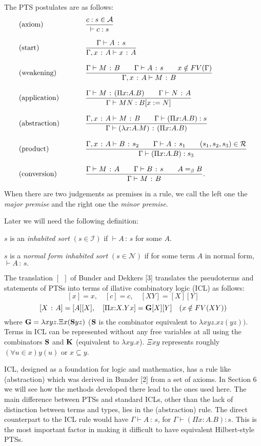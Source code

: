 \documentclass{LMCS}
\def\:{\mathbin{\,:\,}}
\begin{document}
  The PTS postulates are as follows:
\smallskip
{\small\[\begin{tabular}{lllllll}
(axiom)&&& $\displaystyle{{c:s\in {\mathcal A}\over\vdash c:s}}$\cr\cr
(start)&&&$\displaystyle{\Gamma\vdash A\:s\over\Gamma,x\:A\vdash x\:A}$\cr\cr
(weakening)&&& $\displaystyle
{{\Gamma\vdash M\:B\qquad\Gamma\vdash A\:s\qquad x\notin FV
(\Gamma)\over\Gamma, x\:A\vdash M\:B }}$\cr\cr
(application)&&& $\displaystyle{{\Gamma\vdash M\:(\Pi x{:}A.B)\qquad
\Gamma\vdash N\:A\over\Gamma\vdash MN:B[x:=N]}}$\cr\cr
(abstraction)&&&$\displaystyle{{\Gamma,x\:A\vdash
M\:B\qquad\Gamma\vdash(\Pi x{:}A.B):s\over\Gamma\vdash(\lambda
x{:}A.M)\:(\Pi x{:}A.B)}}$\cr\cr
(product)&&&$\displaystyle{{\Gamma,x\:A\vdash B\:s_2
\qquad\Gamma\vdash A\:s_1\qquad (s_1,s_2,s_3)\in {\mathcal R}\over
\Gamma\vdash(\Pi x{:}A.B):s_3}}$\cr\cr
(conversion)&&&$\displaystyle{{\Gamma\vdash M\:A\qquad\Gamma\vdash
B\:s\qquad A=_{\beta} B\over\Gamma\vdash M\:B}}.$\cr
\end{tabular}
\]}\smallskip

  \noindent When there are two judgements as premises in a rule, we call the
  left one the \emph{major premise} and the right one the \emph{minor
    premise}.

  Later we will need the following definition:

\begin{defi}\hfill

  $s$ is an \emph{inhabited sort} $(s\in\mathcal I)$ if $\vdash A\:s$
  for some $A$.

  $s$ is a \emph{normal form inhabited sort} $(s\in\mathcal N)$ if
  for some term $A$ in normal form, $\vdash A\:s.$
\end{defi}

  The translation $[\ \ ]$ of Bunder and Dekkers [3]
  translates the pseudoterms and statements of PTSs into terms
  of illative combinatory logic (ICL) as follows:
\[[x] = x,\quad[c]=c,\quad [XY]=[X][Y]\]
\[[X\:A] = [A][X],\quad [\Pi x{:}X.Yx] ={\bf G} [X][Y]\quad (x\notin FV(XY))\]
  where ${\bf G}=\lambda xyz.\Xi x({\bf S}yz)$ (${\bf S}$ is the
  combinator equivalent to $\lambda xyz.xz(yz))$. Terms in ICL can be
  represented without any free variables at all using the combinators
  ${\bf S}$ and ${\bf K}$ (equivalent to $\lambda xy.x$). $\Xi xy$
  represents roughly $(\forall u\in x) y(u)$ or $x\subseteq y$.

  ICL, designed as a foundation for logic and mathematics, has a rule
  like (abstraction) which was derived in Bunder [2] from a set of
  axioms. In Section 6 we will see how the methods developed there
  lead to the ones used here. The main difference between PTSs and
  standard ICLs, other than the lack of distinction between terms and
  types, lies in the (abstraction) rule. The direct counterpart to the
  ICL rule would have $\Gamma\vdash A\:s$, for $\Gamma\vdash(\Pi
  x{:}A.B):s$.  This is the most important factor in making it
  difficult to have equivalent Hilbert-style PTSs.
\end{document}
